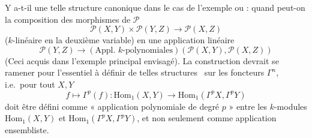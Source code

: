 \documentclass[11pt,a4paper]{article}
\begin{document}
Y a-t-il une telle structure canonique dans le cas de l'exemple ou
 : quand peut-on  la composition
des morphismes de $\mathcal{P}$
\[
\mathcal{P}(X, Y) \times \mathcal{P}(Y, Z) \longrightarrow \mathcal{P}(X, Z)
\]
($k$-linéaire en la deuxième variable) en une application linéaire
\[
\mathcal{P}(Y, Z) \longrightarrow
(\text{Appl.\ } k\text{-polynomiales})(\mathcal{P}(X, Y), \mathcal{P}(X, Z))
\]
(Ceci \ill{} acquis dans l'exemple principal envisagé). La construction
devrait se ramener pour l'essentiel à définir de telles structures
\ sur les foncteurs $\Gamma^{n}$, i.e.\ pour tout $X, Y$
\[
f \longmapsto \Gamma^{p}(f) : \mathrm{Hom}_1(X, Y) \longrightarrow
\mathrm{Hom}_1(\Gamma^{p} X, \Gamma^{p} Y)
\]
doit être défini comme « application polynomiale de degré $p$ » entre les
$k$-modules $\mathrm{Hom}_1(X, Y)$ et
$\mathrm{Hom}_1(\Gamma^{p} X, \Gamma^{p} Y)$, et non seulement comme
application ensembliste.
\end{document}
